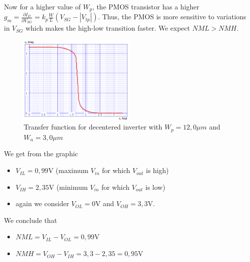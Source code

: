 \documentclass[../main.tex]{subfiles}
\begin{document}
{		Now for a higher value of $W_p$, the PMOS transistor has a higher $g_m = \frac{\partial I_D}{\partial V_{SG}} = k_p \frac{W}{L}(V_{SG} - |V_{tp}|)$. Thus, the PMOS is more sensitive to variations in $V_{SG}$ which makes the high-low transition faster.  We expect $NML > NMH$.
		
		\begin{figure}[H]
			\centering
			\includegraphics[width=0.5\textwidth]{plots/Q4_2.png}
			\caption{Transfer function for decentered inverter with $W_p = 12,0\mu m$ and $W_n = 3,0\mu m$}
		\end{figure}
		
		We get from the graphic
		
		\begin{itemize}
			\item $V_{IL} = 0,99$V (maximum $V_{in}$ for which $V_{out}$ is high)
			\item $V_{IH} = 2,35$V (minimum $V_{in}$ for which $V_{out}$ is low)
			\item again we consider $V_{OL} = 0$V and $V_{OH} = 3,3$V.
		\end{itemize}
		
		We conclude that
		\begin{itemize}
			\item $NML = V_{IL} - V_{OL} = 0,99$V
			\item $NMH = V_{OH} - V_{IH} = 3,3 - 2,35 = 0,95$V
		\end{itemize}
	
	}
\end{document}
